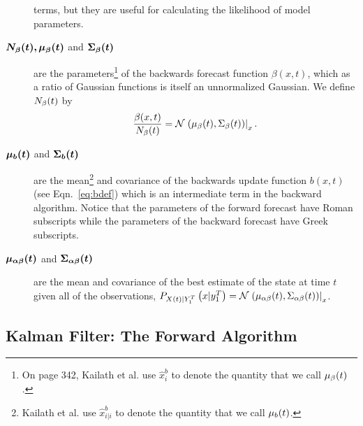 \begin{description}
  terms, but they are useful for calculating the likelihood of model
  parameters.
\item[$\bm{{N_\beta}{(t)},{\mu_\beta}{(t)}}$ and
  $\bm{{\Sigma_\beta}{(t)}}$] are the parameters\footnote{On page
    342, Kailath et al.\cite{KSH00} use $\hat x_i^b$ to denote the
    quantity that we call ${\mu_\beta}{(t)}$.} of the
  backwards forecast function $\beta(x,t)$, which as a ratio of
  Gaussian functions is itself an unnormalized Gaussian.  We define
  ${N_\beta}{(t)}$ by
  \begin{equation*}
    \frac{\beta(x,t)}{{N_\beta}{(t)}} =
    {\mathcal{N}}\left.\left({\mu_\beta}{(t)},{\Sigma_\beta}{(t)}\right)\right|_{x}.
  \end{equation*}
\item[$\bm{{\mu_b}{(t)}}$ and $\bm{{\Sigma_b}{(t)}}$] are the
  mean\footnote{Kailath et al.\cite{KSH00} use $\hat x_{i|i}^b$ to
    denote the quantity that we call ${\mu_b}{(t)}$.} and covariance
  of the backwards update function $b(x,t)$ (see Eqn.~\eqref{eq:bdef})
  which is an intermediate term in the backward algorithm.  Notice
  that the parameters of the forward forecast have Roman subscripts
  while the parameters of the backward forecast have Greek subscripts.
\item[$\bm{{\mu_{\alpha\beta}}{(t)}}$ and
  $\bm{{\Sigma_{\alpha\beta}}{(t)}}$] are the mean and covariance
  of the best estimate of the state at time $t$ given all of the
  observations, \ie $P_{{X}{(t)}|Y_{1}^{T}} \left(x|y_{1}^{T}
  \right) =
  {\mathcal{N}}\left.\left({\mu_{\alpha\beta}}{(t)},{\Sigma_{\alpha\beta}}{(t)}\right)\right|_{x}$.
\end{description}


\subsection{Kalman Filter: The Forward Algorithm}

